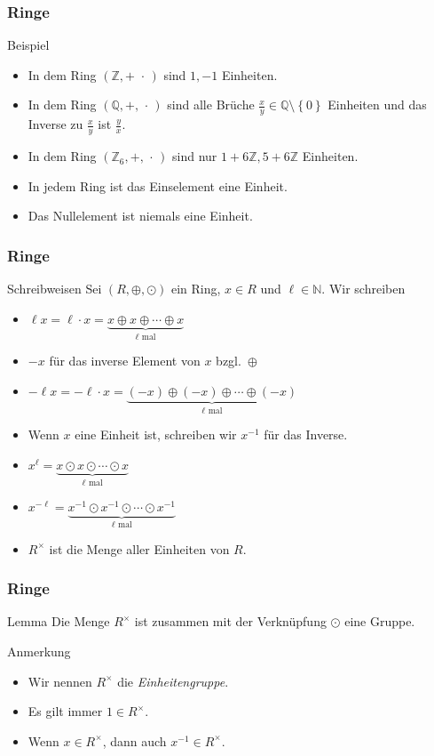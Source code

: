 \documentclass{beamer}
\renewcommand{\emph}[1]{{\textcolor{solarizedRed}{\itshape #1}}}
\newcommand\NN{\mathbb N}
\newcommand\ZZ{\mathbb Z}
\newcommand\QQ{\mathbb Q}
\newcommand\cbc[1]{\left\{{#1}\right\}}
\newcommand{\ue}{\"u}
\renewcommand{\otimes}{\odot}
\begin{document}
\begin{frame}\frametitle{Ringe}
	\begin{block}{Beispiel}
		\begin{itemize}
			\item In dem Ring $(\ZZ,+\,\,\cdot\,)$ sind $1,-1$ Einheiten.
			\item In dem Ring $(\QQ,+,\,\cdot\,)$ sind alle Br\ue che $\frac{x}{y}\in\QQ\setminus\cbc0$ Einheiten und das Inverse zu $\frac{x}{y}$ ist $\frac{y}{x}$.
			\item In dem Ring $(\ZZ_6,+,\,\cdot\,)$ sind nur $1+6\ZZ,5+6\ZZ$ Einheiten.
			\item In jedem Ring ist das Einselement eine Einheit.
			\item Das Nullelement ist niemals eine Einheit.
		\end{itemize}
	\end{block}
\end{frame}

\begin{frame}\frametitle{Ringe}
	\begin{block}{Schreibweisen}
		Sei $(R,\oplus,\otimes)$ ein Ring, $x\in R$ und $\ell\in\NN$.
		Wir schreiben
		\begin{itemize}
			\item $\ell x=\ell\cdot x=\underbrace{x\oplus x\oplus \cdots\oplus x}_{\mbox{$\ell$ mal}}$
			\item $-x$ f\ue r das inverse Element von $x$ bzgl.\ $\oplus$
			\item $-\ell x=-\ell\cdot x=\underbrace{(-x)\oplus (-x)\oplus \cdots\oplus (-x)}_{\mbox{$\ell$ mal}}$
			\item Wenn $x$ eine Einheit ist, schreiben wir $x^{-1}$ f\ue r das Inverse.
			\item $x^\ell=\underbrace{x\otimes x\otimes\cdots\otimes x}_{\mbox{$\ell$ mal}}$
			\item $x^{-\ell}=\underbrace{x^{-1}\otimes x^{-1}\otimes\cdots\otimes x^{-1}}_{\mbox{$\ell$ mal}}$
			\item $R^\times$ ist die Menge aller Einheiten von $R$.
		\end{itemize}
	\end{block}
\end{frame}

\begin{frame}\frametitle{Ringe}
	\begin{block}{Lemma}
		Die Menge $R^\times$ ist zusammen mit der Verkn\ue pfung $\otimes$ eine Gruppe.
	\end{block}
	\begin{block}{Anmerkung}
		\begin{itemize}
			\item Wir nennen $R^\times$ die \emph{Einheitengruppe}.
			\item Es gilt immer $1\in R^\times$.
			\item Wenn $x\in R^\times$, dann auch $x^{-1}\in R^\times$.
		\end{itemize}
	\end{block}
\end{frame}
\end{document}

